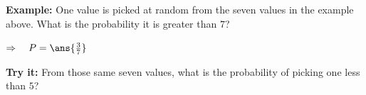\documentclass[12pt]{article}
\begin{document}
\begin{examplebox}
\textbf{Example:} \quad One value is picked at random from the seven values in the example
above. What is the probability it is greater than $7$?

$\Rightarrow\quad P = \ans{\tfrac{3}{7}}$
\end{examplebox}

\begin{tryitbox}
\textbf{Try it:} \quad From those same seven values, what is the probability of picking one
less than $5$?\\[2pt]
\end{tryitbox}
\end{document}
